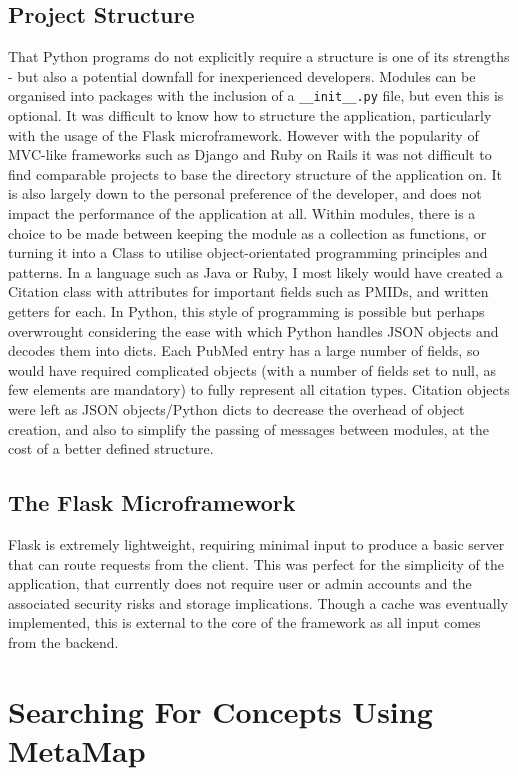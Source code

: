 \documentclass[Report.tex]{subfiles}
\begin{document}
\subsection{Project Structure}
\noindent That Python programs do not explicitly require a structure is one of its strengths - but also a potential downfall for inexperienced developers. Modules can be organised into packages with the inclusion of a \texttt{\_\_init\_\_.py} file, but even this is optional. It was difficult to know how to structure the application, particularly with the usage of the Flask microframework. However with the popularity of MVC-like frameworks such as Django and Ruby on Rails it was not difficult to find comparable projects to base the directory structure of the application on. It is also largely down to the personal preference of the developer, and does not impact the performance of the application at all. Within modules, there is a choice to be made between keeping the module as a collection as functions, or turning it into a Class to utilise object-orientated programming principles and patterns. In a language such as Java or Ruby, I most likely would have created a Citation class with attributes for important fields such as PMIDs, and written getters for each. In Python, this style of programming is possible but perhaps overwrought considering the ease with which Python handles JSON objects and decodes them into dicts. Each PubMed entry has a large number of fields, so would have required complicated objects (with a number of fields set to null, as few elements are mandatory) to fully represent all citation types. Citation objects were left as JSON objects/Python dicts to decrease the overhead of object creation, and also to simplify the passing of messages between modules, at the cost of a better defined structure. 

\subsection{The Flask Microframework}
 Flask is extremely lightweight, requiring minimal input to produce a basic server that can route requests from the client. This was perfect for the simplicity of the application, that currently does not require user or admin accounts and the associated security risks and storage implications. Though a cache was eventually implemented, this is external to the core of the framework as all input comes from the backend. 

\section{Searching For Concepts Using MetaMap}
\end{document}
